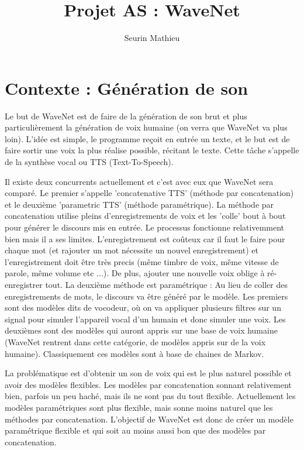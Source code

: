 \documentclass[a4paper]{article}
\title{Projet AS : WaveNet}
\author{Seurin Mathieu}
\begin{document}
\maketitle

\section{Contexte : Génération de son}

Le but de WaveNet \cite{DBLP:journals/corr/OordDZSVGKSK16} est de faire de la génération de son brut et plus particulièrement la génération de voix humaine (on verra que WaveNet va plus loin). L'idée est simple, le programme reçoit en entrée un texte, et le but est de faire sortir une voix la plus réalise possible, récitant le texte. Cette tâche s'appelle de la synthèse vocal ou TTS (Text-To-Speech).

Il existe deux concurrents actuellement et c'est avec eux que WaveNet sera comparé. Le premier s'appelle 'concatenative TTS' (méthode par concatenation) et le deuxième 'parametric TTS' (méthode paramétrique). La méthode par concatenation utilise pleins d'enregistrements de voix et les 'colle' bout à bout pour générer le discours mis en entrée. Le processus fonctionne relativemment bien mais il a ses limites. L'enregistrement est coûteux car il faut le faire pour chaque mot (et rajouter un mot nécessite un nouvel enregistrement) et l'enregistrement doit être très precis (même timbre de voix, même vitesse de parole, même volume etc ...). De plus, ajouter une nouvelle voix oblige à ré-enregistrer tout. La deuxième méthode est paramétrique : Au lieu de coller des enregistrements de mots, le discours va être généré par le modèle. Les premiers sont des modèles dits de vocodeur, où on va appliquer plusieurs filtres sur un signal pour simuler l'appareil vocal d'un humain et donc simuler une voix.
Les deuxièmes sont des modèles qui auront appris sur une base de voix humaine (WaveNet rentrent dans cette catégorie, de modèles appris sur de la voix humaine). Classiquement ces modèles sont à base de chaines de Markov.

La problématique est d'obtenir un son de voix qui est le plus naturel possible et avoir des modèles flexibles. Les modèles par concatenation sonnant relativement bien, parfois un peu haché, mais ils ne sont pas du tout flexible. Actuellement les modèles paramétriques sont plus flexible, mais sonne moins naturel que les méthodes par concatenation.
L'objectif de WaveNet est donc de créer un modèle paramétrique flexible et qui soit au moins aussi bon que des modèles par concatenation.
\end{document}
